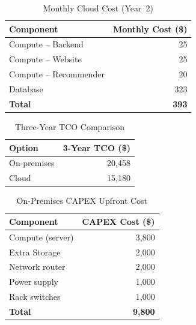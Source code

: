 \documentclass[conference]{IEEEtran}
\begin{document}
\begin{table}[H]
\caption{Monthly Cloud Cost (Year~2)}
\label{tab:cloud_monthly}
\begin{center}
\begin{tabular}{lr}
\toprule
\textbf{Component} & \textbf{Monthly Cost (\$)} \\
\midrule
Compute -- Backend & 25 \\
Compute -- Website & 25 \\
Compute -- Recommender & 20 \\
Database & 323 \\
\midrule
\textbf{Total} & \textbf{393} \\
\bottomrule
\end{tabular}
\end{center}
\end{table}

\begin{table}[H]
\caption{Three-Year TCO Comparison}
\label{tab:tco}
\begin{center}
\begin{tabular}{lr}
\toprule
\textbf{Option} & \textbf{3-Year TCO (\$)} \\
\midrule
On-premises & 20,458 \\
Cloud & 15,180 \\
\bottomrule
\end{tabular}
\end{center}
\end{table}

\begin{table}[H]
\caption{On-Premises CAPEX Upfront Cost}
\label{tab:capex}
\begin{center}
\begin{tabular}{lr}
\toprule
\textbf{Component} & \textbf{CAPEX Cost (\$)} \\
\midrule
Compute (server) & 3,800 \\
Extra Storage & 2,000 \\
Network router & 2,000 \\
Power supply & 1,000 \\
Rack switches & 1,000 \\
\midrule
\textbf{Total} & \textbf{9,800} \\
\bottomrule
\end{tabular}
\end{center}
\end{table}

\FloatBarrier
\end{document}
